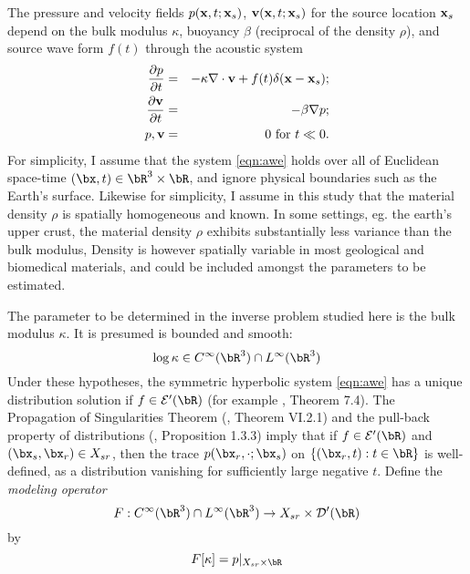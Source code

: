 The pressure and velocity fields $p({\bf x},t;{\bf x}_s)$,
${\bf v}({\bf x},t;{\bf x}_s)$ for the source location ${\bf x}_s$
depend on the bulk modulus $\kappa$, buoyancy $\beta$
(reciprocal of the density $\rho$), and source wave
form $f(t)$ through the acoustic system
\begin{eqnarray}
  \label{eqn:awe}
 \frac{\partial p}{\partial t} & = &- \kappa \nabla \cdot {\bf v} +
                                    f(t) \delta({\bf x}-{\bf x}_s); \nonumber \\
\frac{\partial {\bf v}}{\partial t} & = & - \beta \nabla p; \\ 
p, {\bf v} & = & 0 \mbox{ for }  t \ll 0.
\end{eqnarray}
For simplicity, I assume that the system \ref{eqn:awe} holds over all of Euclidean
space-time $(\bx,t) \in \bR^3 \times \bR$, and ignore physical
boundaries such as the Earth's surface. Likewise for simplicity, I
assume in this study that the material density $\rho$ is spatially
homogeneous and known. In some settings, eg. the earth's
upper crust, the material density $\rho$ exhibits substantially less variance than the
bulk modulus, Density is however spatially variable in most geological
and biomedical materials, and could be included amongst the parameters
to be estimated.

The parameter to be determined in the inverse problem studied here is
the bulk modulus $\kappa$. It is presumed is bounded and smooth:
\begin{equation}
  \label{eqn:coeff}
  \log \kappa \in C^{\infty}(\bR^3) \cap L^{\infty}(\bR^3)
\end{equation}
Under these hypotheses, the symmetric hyperbolic system \ref{eqn:awe}
has a unique distribution
solution if $f \in \cal{E}'(\bR)$ (for example \cite{Lax:PDENotes},
Theorem 7.4). The Propagation of
Singularities Theorem (\cite{Tay:81}, Theorem VI.2.1) and
the pull-back property of distributions (\cite{Dui:95}, Proposition 1.3.3)
imply that if $f \in \cal{E}'(\bR)$ and $(\bx_s,\bx_r) \in X_{sr}$,
then the trace $p(\bx_r, \cdot;\bx_s)$ on $\{(\bx_r,t): t \in \bR\}$ is well-defined,
as a distribution vanishing for sufficiently large
negative $t$. Define the {\em modeling operator}
\begin{equation}
  \label{eqn:modop}
  F: C^{\infty}(\bR^3) \cap L^{\infty}(\bR^3)
  \rightarrow X_{sr} \times {\cal D}'(\bR)
\end{equation}
by
\begin{equation}
  \label{eqn:modopdef}
  F[\kappa]= p|_{X_{sr} \times \bR}
\end{equation}

